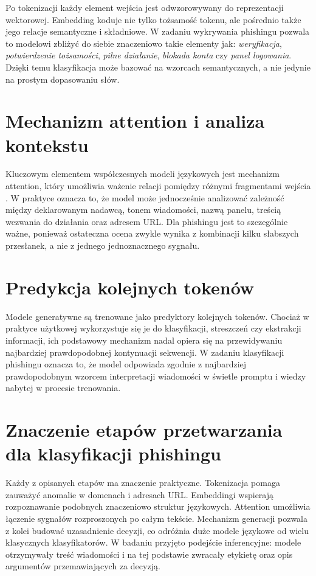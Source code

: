 \documentclass[12pt,a4paper,openright]{report}
\begin{document}
Po tokenizacji każdy element wejścia jest odwzorowywany do reprezentacji wektorowej. Embedding koduje nie tylko tożsamość tokenu, ale pośrednio także jego relacje semantyczne i składniowe. W zadaniu wykrywania phishingu pozwala to modelowi zbliżyć do siebie znaczeniowo takie elementy jak: \textit{weryfikacja}, \textit{potwierdzenie tożsamości}, \textit{pilne działanie}, \textit{blokada konta} czy \textit{panel logowania}. Dzięki temu klasyfikacja może bazować na wzorcach semantycznych, a nie jedynie na prostym dopasowaniu słów.

\section{Mechanizm attention i analiza kontekstu}

Kluczowym elementem współczesnych modeli językowych jest mechanizm attention, który umożliwia ważenie relacji pomiędzy różnymi fragmentami wejścia \cite{vaswani2017attention}. W praktyce oznacza to, że model może jednocześnie analizować zależność między deklarowanym nadawcą, tonem wiadomości, nazwą panelu, treścią wezwania do działania oraz adresem URL. Dla phishingu jest to szczególnie ważne, ponieważ ostateczna ocena zwykle wynika z kombinacji kilku słabszych przesłanek, a nie z jednego jednoznacznego sygnału.

\section{Predykcja kolejnych tokenów}

Modele generatywne są trenowane jako predyktory kolejnych tokenów. Chociaż w praktyce użytkowej wykorzystuje się je do klasyfikacji, streszczeń czy ekstrakcji informacji, ich podstawowy mechanizm nadal opiera się na przewidywaniu najbardziej prawdopodobnej kontynuacji sekwencji. W zadaniu klasyfikacji phishingu oznacza to, że model odpowiada zgodnie z najbardziej prawdopodobnym wzorcem interpretacji wiadomości w świetle promptu i wiedzy nabytej w procesie trenowania.

\section{Znaczenie etapów przetwarzania dla klasyfikacji phishingu}

Każdy z opisanych etapów ma znaczenie praktyczne. Tokenizacja pomaga zauważyć anomalie w domenach i adresach URL. Embeddingi wspierają rozpoznawanie podobnych znaczeniowo struktur językowych. Attention umożliwia łączenie sygnałów rozproszonych po całym tekście. Mechanizm generacji pozwala z kolei budować uzasadnienie decyzji, co odróżnia duże modele językowe od wielu klasycznych klasyfikatorów. W badaniu przyjęto podejście inferencyjne: modele otrzymywały treść wiadomości i na tej podstawie zwracały etykietę oraz opis argumentów przemawiających za decyzją.
\end{document}
